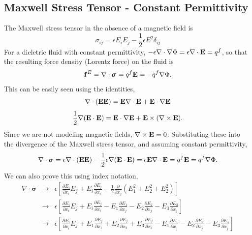\documentclass[final]{siamltex}
\def\Eb {{\bf E}}
\def\fb {{\bf f}}
\def\sigmab {\boldsymbol{\sigma}}
\def\half   {\frac{1}{2}}
\begin{document}
\subsection{Maxwell Stress Tensor - Constant Permittivity}
The Maxwell stress tensor in the absence of a magnetic field is
\begin{equation}
\sigma_{ij} = \epsilon E_i E_j - \half\epsilon E^2 \delta_{ij}
\end{equation}
For a dieletric fluid with constant permittivity, $-\epsilon\nabla\cdot\nabla\Phi = \epsilon\nabla\cdot\Eb = q^f$, so that
the resulting force density (Lorentz force) on the fluid is
\begin{equation}
\fb^E = \nabla\cdot\sigmab = q^f\Eb = -q^f\nabla\Phi.
\end{equation}
This can be easily seen using the identities,
\begin{equation}
\nabla\cdot(\Eb\Eb) = \Eb\nabla\cdot\Eb + \Eb\cdot\nabla\Eb
\end{equation}
\begin{equation}
\half\nabla(\Eb\cdot\Eb) = \Eb\cdot\nabla\Eb + \Eb\times(\nabla\times\Eb).
\end{equation}
Since we are not modeling magnetic fields, $\nabla\times\Eb=0$.  Substituting these
into the divergence of the Maxwell stress tensor, and assuming constant permittivity,
\begin{equation}
\nabla\cdot\sigmab = \epsilon\nabla\cdot(\Eb\Eb) - \half\epsilon\nabla(\Eb\cdot\Eb) = \epsilon\Eb\nabla\cdot\Eb = q^f\Eb = q^f\nabla\Phi.
\end{equation}
We can also prove this using index notation,
\begin{eqnarray}
\nabla\cdot\sigmab &\rightarrow& \epsilon\left[\frac{\partial E_i}{\partial x_i}E_j + E_i\frac{\partial E_j}{\partial x_i} - \half\frac{\partial}{\partial x_j}\left(E_1^2 + E_2^2 + E_2^2\right)\right]\nonumber\\
&\rightarrow& \epsilon\left[\frac{\partial E_i}{\partial x_i}E_j + E_i\frac{\partial E_j}{\partial x_i} - E_1\frac{\partial E_1}{\partial x_j} - E_2\frac{\partial E_2}{\partial x_j} - E_3\frac{\partial E_3}{\partial x_j}\right]\nonumber\\
&\rightarrow& \epsilon\left[\frac{\partial E_i}{\partial x_i}E_j
+ E_1\frac{\partial E_j}{\partial x_1}
+ E_2\frac{\partial E_j}{\partial x_2}
+ E_3\frac{\partial E_j}{\partial x_3}
- E_1\frac{\partial E_1}{\partial x_j}
- E_2\frac{\partial E_2}{\partial x_j}
- E_3\frac{\partial E_3}{\partial x_j}\right]\label{eq:Lorentz}
\end{eqnarray}
\end{document}
